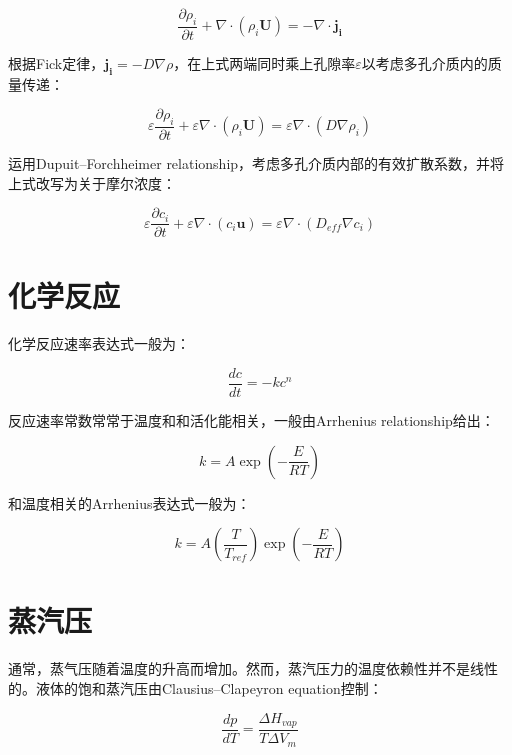 \begin{equation}
\frac{\partial \rho_i}{\partial t} + \nabla\cdot(\rho_i\bm{U}) = -\nabla\cdot \bm{j_i}
\end{equation}

根据Fick定律，$ \bm{j_i} = -D\nabla\rho $，在上式两端同时乘上孔隙率$ \varepsilon $以考虑多孔介质内的质量传递：

\begin{equation}
\varepsilon\frac{\partial \rho_i}{\partial t} + \varepsilon\nabla\cdot(\rho_i\bm{U}) = \varepsilon\nabla\cdot(D\nabla \rho_i)
\end{equation}

运用Dupuit–Forchheimer relationship，考虑多孔介质内部的有效扩散系数，并将上式改写为关于摩尔浓度：

\begin{equation}
\varepsilon\frac{\partial c_i}{\partial t} + \varepsilon\nabla\cdot(c_i\bm{u}) = \varepsilon\nabla\cdot(D_{eff}\nabla c_i)
\end{equation}

\section{化学反应}

化学反应速率表达式一般为：

\begin{equation}
\frac{dc}{dt} = -kc^n
\end{equation}

反应速率常数常常于温度和和活化能相关，一般由Arrhenius relationship给出：

\begin{equation}
k = A \exp(-\frac{E}{RT})
\end{equation}

和温度相关的Arrhenius表达式一般为：

\begin{equation}
k = A \left( \frac{T}{T_{ref}} \right) \exp(-\frac{E}{RT})
\end{equation}

\section{蒸汽压}

通常，蒸气压随着温度的升高而增加。然而，蒸汽压力的温度依赖性并不是线性的。液体的饱和蒸汽压由Clausius–Clapeyron equation控制：

\begin{equation}
\frac{dp}{dT} = \frac{\Delta H_{vap}}{T\Delta V_m}
\end{equation}

